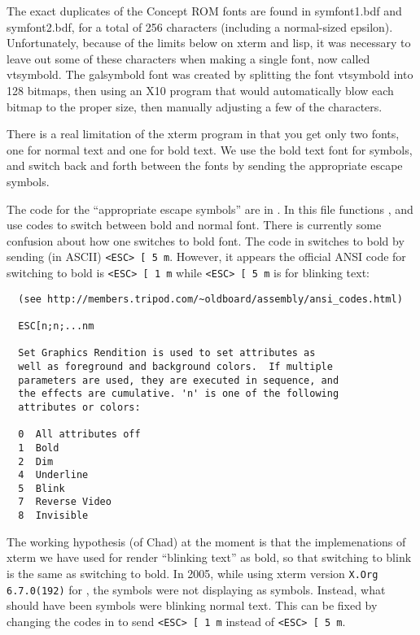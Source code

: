 The exact duplicates of the Concept ROM fonts are found in symfont1.bdf and
symfont2.bdf, for a total of 256 characters (including a normal-sized epsilon).
Unfortunately, because of the limits below on xterm and lisp, it was necessary to
leave out some of these characters when making a single font, now called
vtsymbold.   The galsymbold font was created by splitting the font vtsymbold
into 128 bitmaps, then using an X10 program that would automatically blow
each bitmap to the proper size, then manually adjusting a few of
the characters.

There is a real limitation of the xterm program in that you get only two
fonts, one for normal text and one for bold text.  
We use the bold text
font for symbols, and switch back and forth between the fonts by sending
the appropriate escape symbols.  

The code for the ``appropriate escape symbols'' are in .
In this file functions
,  
and  
use codes to switch between bold and normal font.
There is currently some confusion about
how one switches to bold font.  The code in 
switches to bold by sending (in ASCII) \verb+<ESC> [ 5 m+.
However, it appears the official ANSI code for switching
to bold is \verb+<ESC> [ 1 m+ 
while \verb+<ESC> [ 5 m+ is for blinking text:

\begin{verbatim}
  (see http://members.tripod.com/~oldboard/assembly/ansi_codes.html)

  ESC[n;n;...nm

  Set Graphics Rendition is used to set attributes as
  well as foreground and background colors.  If multiple
  parameters are used, they are executed in sequence, and
  the effects are cumulative. 'n' is one of the following
  attributes or colors:

  0  All attributes off
  1  Bold
  2  Dim
  4  Underline
  5  Blink
  7  Reverse Video
  8  Invisible
\end{verbatim}

The working hypothesis (of Chad) at the moment is
that the implemenations of xterm we have used for
\TPS render ``blinking text'' as bold, so that switching
to blink is the same as switching to bold.  In 2005,
while using xterm version \verb+X.Org 6.7.0(192)+
for \TPS, the symbols were not displaying as symbols.
Instead, what should have been symbols were blinking
normal text.  This can be fixed by changing the
codes in  to send \verb+<ESC> [ 1 m+ 
instead of \verb+<ESC> [ 5 m+.

